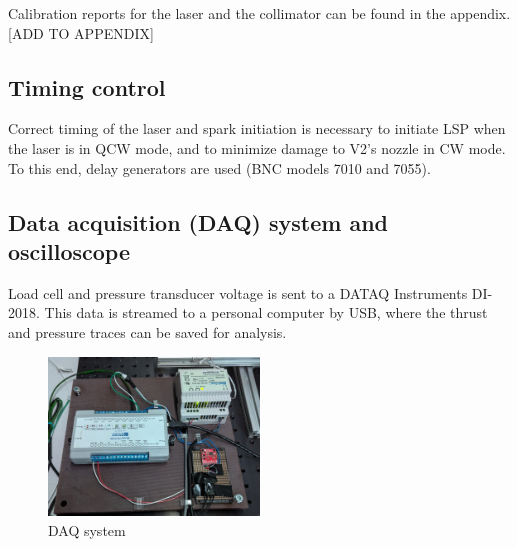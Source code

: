             Calibration reports for the laser and the collimator can be found in the appendix. [ADD TO APPENDIX]

        \subsection{Timing control}

            Correct timing of the laser and spark initiation is necessary to initiate LSP when the laser is in QCW mode, and to minimize damage to V2's nozzle in CW mode. To this end, delay generators are used (BNC models 7010 and 7055).

        \subsection{Data acquisition (DAQ) system and oscilloscope}

            Load cell and pressure transducer voltage is sent to a DATAQ Instruments DI-2018. This data is streamed to a personal computer by USB, where the thrust and pressure traces can be saved for analysis.

            \begin{figure}[!ht]
                \centering
                \includegraphics[width=0.50\textwidth]{assets/3 design/DAQ electronics.jpg}
                \caption{DAQ system}
                \label{fig:DAQ}
            \end{figure}